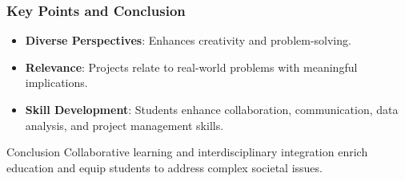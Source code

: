 \documentclass{beamer}
\begin{document}
\begin{frame}[fragile]
    \frametitle{Key Points and Conclusion}
    
    \begin{itemize}
        \item \textbf{Diverse Perspectives}: Enhances creativity and problem-solving.
        \item \textbf{Relevance}: Projects relate to real-world problems with meaningful implications.
        \item \textbf{Skill Development}: Students enhance collaboration, communication, data analysis, and project management skills.
    \end{itemize}
    
    \begin{block}{Conclusion}
        Collaborative learning and interdisciplinary integration enrich education and equip students to address complex societal issues.
    \end{block}
\end{frame}
\end{document}
